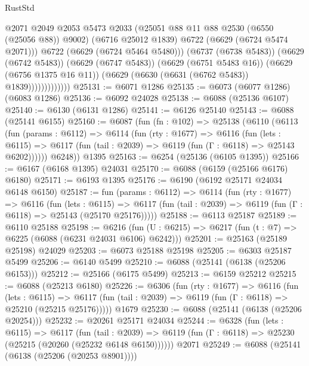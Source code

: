 \begin{lexlean}{RustStd}
\begin{coremodule}
                              @2071
                              @2049
                              @2053
                              @5473
                              @2033
                              (@25051 @88 @11 @88 @2530 (@6550 (@25056 @88)) @9002)
                              (@6716 @25012 @1839)
                              @6722
                              (@6629 (@6724 @5474 @2071)))
                            @6722
                            (@6629 (@6724 @5464 @5480)))
                          (@6737 (@6738 @5483))
                          (@6629 (@6742 @5483))
                          (@6629 (@6747 @5483))
                          (@6629 (@6751 @5483 @16))
                          (@6629 (@6756 @1375 @16 @11))
                          (@6629 (@6630 (@6631 (@6762 @5483)) @1839)))))))))))))
@25131 := @6071 @1286
@25135 := @6073 (@6077 @1286) (@6083 @1286)
@25136 := @6092 @24028
@25138 := @6088 (@25136 @6107)
@25140 := @6130 (@6131 @1286)
@25141 := @6126 @25140
@25143 := @6088 (@25141 @6155)
@25160 := @6087
    (fun (fn : @102) =>
    @25138
      (@6110
        (@6113
          (fun (params : @6112) =>
          @6114
            (fun (rty : @1677) =>
            @6116
              (fun (lets : @6115) =>
              @6117 (fun (tail : @2039) => @6119 (fun (Γ : @6118) => @25143 @6202))))))
        @6248))
    @1395
@25163 := @6254 (@25136 (@6105 @1395))
@25166 := @6167 (@6168 @1395) @24031
@25170 := @6088 (@6159 (@25166 @6176) @6180)
@25171 := @6193 @1395
@25176 := @6190 (@6192 @25171 @24034 @6148 @6150)
@25187 := fun (params : @6112) =>
  @6114
    (fun (rty : @1677) =>
    @6116
      (fun (lets : @6115) =>
      @6117 (fun (tail : @2039) => @6119 (fun (Γ : @6118) => @25143 (@25170 @25176)))))
@25188 := @6113 @25187
@25189 := @6110 @25188
@25198 := @6216
    (fun (U : @6215) => @6217 (fun (t : @7) => @6225 (@6088 (@6231 @24031 @6106) @6242)))
@25201 := @25163 (@25189 @25198) @24029
@25203 := @6073 @25188 @25198
@25205 := @6303 @25187 @5499
@25206 := @6140 @5499
@25210 := @6088 (@25141 (@6138 (@25206 @6153)))
@25212 := @25166 (@6175 @5499)
@25213 := @6159 @25212
@25215 := @6088 (@25213 @6180)
@25226 := @6306
    (fun (rty : @1677) =>
    @6116
      (fun (lets : @6115) =>
      @6117 (fun (tail : @2039) => @6119 (fun (Γ : @6118) => @25210 (@25215 @25176)))))
    @1679
@25230 := @6088 (@25141 (@6138 (@25206 @20254)))
@25232 := @20261 @25171 @24034
@25244 := @6328
    (fun (lets : @6115) =>
    @6117
      (fun (tail : @2039) =>
      @6119 (fun (Γ : @6118) => @25230 (@25215 (@20260 (@25232 @6148 @6150))))))
    @2071
@25249 := @6088 (@25141 (@6138 (@25206 (@20253 @8901))))

\end{coremodule}
\end{lexlean}
